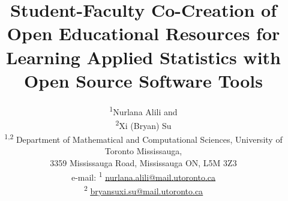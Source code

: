 \documentclass[11pt]{article}
\title{Student-Faculty Co-Creation of Open Educational Resources for Learning Applied Statistics with Open Source Software Tools}
\author{%
    \begin{tabular}{c}
        \textsuperscript{1}Nurlana Alili and\\
        \textsuperscript{2}Xi (Bryan) Su \\[6pt]
        \textsuperscript{1,2} Department of Mathematical and Computational Sciences, University of Toronto Mississauga, \\ 
        3359 Mississauga Road, Mississauga ON, L5M 3Z3\\[6pt]
        e-mail: \textsuperscript{1} \href{mailto:nurlana.alili@mail.utoronto.ca}{\uline{nurlana.alili@mail.utoronto.ca}}\\
        \textsuperscript{2} \href{mailto:bryansuxi.su@mail.utoronto.ca}{\uline{bryansuxi.su@mail.utoronto.ca}}
    \end{tabular}%
}
\date{}
\begin{document}
\maketitle

\begin{abstract}
%
%


\end{abstract}
\end{document}
